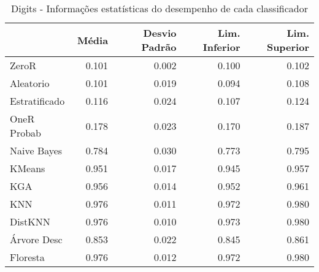 \begin{table}
\centering
\label{Digits_status_table}
\begin{tabular}{lrrrr}
\toprule
{} & Média & Desvio Padrão & Lim. Inferior & Lim. Superior \\
\midrule
ZeroR         & 0.101 &         0.002 &         0.100 &         0.102 \\
Aleatorio     & 0.101 &         0.019 &         0.094 &         0.108 \\
Estratificado & 0.116 &         0.024 &         0.107 &         0.124 \\
OneR Probab   & 0.178 &         0.023 &         0.170 &         0.187 \\
Naive Bayes   & 0.784 &         0.030 &         0.773 &         0.795 \\
KMeans        & 0.951 &         0.017 &         0.945 &         0.957 \\
KGA           & 0.956 &         0.014 &         0.952 &         0.961 \\
KNN           & 0.976 &         0.011 &         0.972 &         0.980 \\
DistKNN       & 0.976 &         0.010 &         0.973 &         0.980 \\
Árvore Desc   & 0.853 &         0.022 &         0.845 &         0.861 \\
Floresta      & 0.976 &         0.012 &         0.972 &         0.980 \\
\bottomrule
\end{tabular}
\caption{Digits - Informações estatísticas do desempenho de cada classificador}
\end{table}
